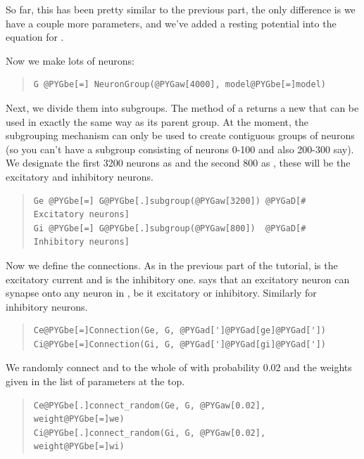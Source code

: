 \documentclass[letterpaper,10pt]{manual}
\begin{document}
So far, this has been pretty similar to the previous part, the only
difference is we have a couple more parameters, and we've added a
resting potential  into the equation for .

Now we make lots of neurons:
\begin{quote}

\begin{Verbatim}[commandchars=@\[\]]
G @PYGbe[=] NeuronGroup(@PYGaw[4000], model@PYGbe[=]model)
\end{Verbatim}
\end{quote}

Next, we divide them into subgroups. The \hyperlink{brian.NeuronGroup.subgroup}{} method of a
\hyperlink{brian.NeuronGroup}{} returns a new \hyperlink{brian.NeuronGroup}{} that can be used in
exactly the same way as its parent group. At the moment, the
subgrouping mechanism can only be used to create contiguous
groups of neurons (so you can't have a subgroup consisting
of neurons 0-100 and also 200-300 say). We designate the
first 3200 neurons as  and the second 800 as , these
will be the excitatory and inhibitory neurons.
\begin{quote}

\begin{Verbatim}[commandchars=@\[\]]
Ge @PYGbe[=] G@PYGbe[.]subgroup(@PYGaw[3200]) @PYGaD[# Excitatory neurons]
Gi @PYGbe[=] G@PYGbe[.]subgroup(@PYGaw[800])  @PYGaD[# Inhibitory neurons]
\end{Verbatim}
\end{quote}

Now we define the connections. As in the previous part of the
tutorial,  is the excitatory current and  is the inhibitory
one.  says that an excitatory neuron can synapse onto any
neuron in , be it excitatory or inhibitory. Similarly for
inhibitory neurons.
\begin{quote}

\begin{Verbatim}[commandchars=@\[\]]
Ce@PYGbe[=]Connection(Ge, G, @PYGad[']@PYGad[ge]@PYGad['])
Ci@PYGbe[=]Connection(Gi, G, @PYGad[']@PYGad[gi]@PYGad['])
\end{Verbatim}
\end{quote}

We randomly connect  and  to the whole of  with
probability 0.02 and the weights given in the list of
parameters at the top.
\begin{quote}

\begin{Verbatim}[commandchars=@\[\]]
Ce@PYGbe[.]connect_random(Ge, G, @PYGaw[0.02], weight@PYGbe[=]we)
Ci@PYGbe[.]connect_random(Gi, G, @PYGaw[0.02], weight@PYGbe[=]wi)
\end{Verbatim}
\end{quote}
\end{document}
